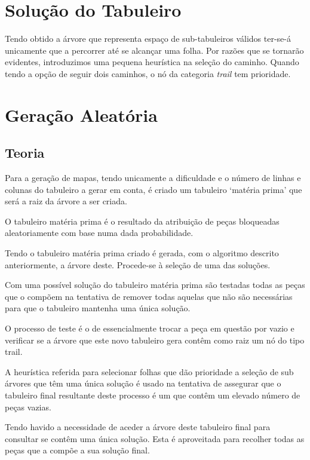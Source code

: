 \documentclass[a4paper]{report} %
\begin{document}
\chapter{Solução do Tabuleiro}

Tendo obtido a árvore que representa espaço de sub-tabuleiros válidos ter-se-á unicamente que a percorrer até se alcançar uma folha. Por razões que se tornarão evidentes, introduzimos uma pequena heurística na seleção do caminho. Quando tendo a opção de seguir dois caminhos, o nó da categoria \textit{trail} tem prioridade. 

\chapter{Geração Aleatória}

\section{Teoria}

Para a geração de mapas, tendo unicamente a dificuldade e o número de linhas e colunas do tabuleiro a gerar em conta, é criado um tabuleiro ‘matéria prima’ que será a raiz da árvore a ser criada.

O tabuleiro matéria prima é o resultado da atribuição de peças bloqueadas aleatoriamente com base numa dada probabilidade.

Tendo o tabuleiro matéria prima criado é gerada, com o algoritmo descrito anteriormente, a árvore deste. Procede-se à seleção de uma das soluções.

Com uma possível solução do tabuleiro matéria prima são testadas todas as peças que o compõem na tentativa de remover todas aquelas que não são necessárias para que o tabuleiro mantenha uma única solução.

O processo de teste é o de essencialmente trocar a peça em questão por vazio e verificar se a árvore que este novo tabuleiro gera contêm como raiz um nó do tipo trail.

A heurística referida para selecionar folhas que dão prioridade a seleção de sub árvores que têm uma única solução é usado na tentativa de assegurar que o tabuleiro final resultante deste processo é um que contêm um elevado número de peças vazias.

Tendo havido a necessidade de aceder a árvore deste tabuleiro final para consultar se contêm uma única solução. Esta é aproveitada para recolher todas as peças que a compõe a sua solução final.
\end{document}
